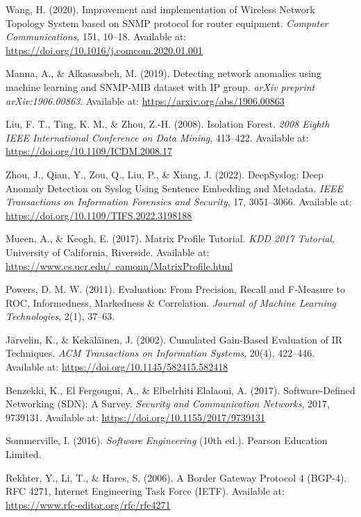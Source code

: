 \documentclass[11pt]{article}
\begin{document}
\begin{thebibliography}{9}
Wang, H. (2020).
Improvement and implementation of Wireless Network Topology System based on SNMP protocol for router equipment.
\textit{Computer Communications}, 151, 10--18.
Available at: \href{https://doi.org/10.1016/j.comcom.2020.01.001}{https://doi.org/10.1016/j.comcom.2020.01.001}

Manna, A., \& Alkasassbeh, M. (2019).
Detecting network anomalies using machine learning and SNMP-MIB dataset with IP group.
\textit{arXiv preprint arXiv:1906.00863}.
Available at: \href{https://arxiv.org/abs/1906.00863}{https://arxiv.org/abs/1906.00863}

Liu, F. T., Ting, K. M., \& Zhou, Z.-H. (2008).
Isolation Forest.
\textit{2008 Eighth IEEE International Conference on Data Mining}, 413--422.
Available at: \href{https://doi.org/10.1109/ICDM.2008.17}{https://doi.org/10.1109/ICDM.2008.17}

Zhou, J., Qian, Y., Zou, Q., Liu, P., \& Xiang, J. (2022).
DeepSyslog: Deep Anomaly Detection on Syslog Using Sentence Embedding and Metadata.
\textit{IEEE Transactions on Information Forensics and Security}, 17, 3051--3066.
Available at: \href{https://doi.org/10.1109/TIFS.2022.3198188}{https://doi.org/10.1109/TIFS.2022.3198188}

Mueen, A., \& Keogh, E. (2017).
Matrix Profile Tutorial.
\textit{KDD 2017 Tutorial}, University of California, Riverside.
Available at: \href{https://www.cs.ucr.edu/~eamonn/MatrixProfile.html}{https://www.cs.ucr.edu/~eamonn/MatrixProfile.html}

Powers, D. M. W. (2011).
Evaluation: From Precision, Recall and F-Measure to ROC, Informedness, Markedness \& Correlation.
\textit{Journal of Machine Learning Technologies}, 2(1), 37--63.

Järvelin, K., \& Kekäläinen, J. (2002).
Cumulated Gain-Based Evaluation of IR Techniques.
\textit{ACM Transactions on Information Systems}, 20(4), 422--446.
Available at: \href{https://doi.org/10.1145/582415.582418}{https://doi.org/10.1145/582415.582418}

Benzekki, K., El Fergougui, A., \& Elbelrhiti Elalaoui, A. (2017).
Software-Defined Networking (SDN): A Survey.
\textit{Security and Communication Networks}, 2017, 9739131.
Available at: \href{https://doi.org/10.1155/2017/9739131}{https://doi.org/10.1155/2017/9739131}

Sommerville, I. (2016).
\textit{Software Engineering} (10th ed.).
Pearson Education Limited.

Rekhter, Y., Li, T., \& Hares, S. (2006).
A Border Gateway Protocol 4 (BGP-4).
RFC 4271, Internet Engineering Task Force (IETF).
Available at: \href{https://www.rfc-editor.org/rfc/rfc4271}{https://www.rfc-editor.org/rfc/rfc4271}

\end{thebibliography}
\end{document}
